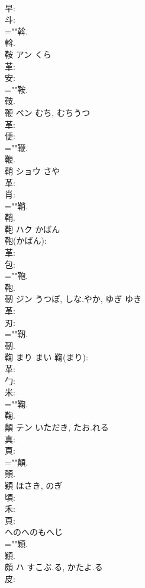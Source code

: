 \documentclass[8pt]{extreport}
\begin{document}
\begin{CJK}{UTF8}{min}
\\	早: 
\\	斗: 
\\	=""斡.
\\	斡.
\\	鞍	アン	くら		
\\	革: 
\\	安: 
\\	=""鞍.
\\	鞍.
\\	鞭	ベン	むち, むちうつ		
\\	革: 
\\	便: 
\\	=""鞭.
\\	鞭.
\\	鞘	ショウ	さや		
\\	革: 
\\	肖: 
\\	=""鞘.
\\	鞘.
\\	鞄	ハク	かばん		
\\	鞄(かばん): 
\\	革: 
\\	包: 
\\	=""鞄.
\\	鞄.
\\	靭	ジン	うつぼ, しな.やか, ゆぎ	ゆき	
\\	革: 
\\	刃: 
\\	=""靭.
\\	靭.
\\	鞠		まり	まい		鞠(まり): 
\\	革: 
\\	勹: 
\\	米: 
\\	=""鞠.
\\	鞠.
\\	顛	テン	いただき, たお.れる		
\\	真: 
\\	頁: 
\\	=""顛.
\\	顛.
\\	穎		ほさき, のぎ				
\\	頃: 
\\	禾: 
\\	頁: 
\\	へのへのもへじ
\\	=""穎.
\\	穎.
\\	頗	ハ	すこぶ.る, かたよ.る		
\\	皮: 

\end{CJK}
\end{document}
